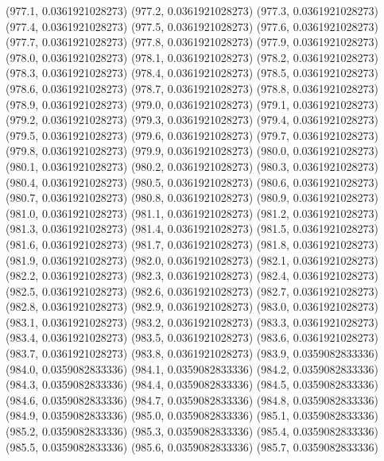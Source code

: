 {					(977.1, 0.0361921028273)
					(977.2, 0.0361921028273)
					(977.3, 0.0361921028273)
					(977.4, 0.0361921028273)
					(977.5, 0.0361921028273)
					(977.6, 0.0361921028273)
					(977.7, 0.0361921028273)
					(977.8, 0.0361921028273)
					(977.9, 0.0361921028273)
					(978.0, 0.0361921028273)
					(978.1, 0.0361921028273)
					(978.2, 0.0361921028273)
					(978.3, 0.0361921028273)
					(978.4, 0.0361921028273)
					(978.5, 0.0361921028273)
					(978.6, 0.0361921028273)
					(978.7, 0.0361921028273)
					(978.8, 0.0361921028273)
					(978.9, 0.0361921028273)
					(979.0, 0.0361921028273)
					(979.1, 0.0361921028273)
					(979.2, 0.0361921028273)
					(979.3, 0.0361921028273)
					(979.4, 0.0361921028273)
					(979.5, 0.0361921028273)
					(979.6, 0.0361921028273)
					(979.7, 0.0361921028273)
					(979.8, 0.0361921028273)
					(979.9, 0.0361921028273)
					(980.0, 0.0361921028273)
					(980.1, 0.0361921028273)
					(980.2, 0.0361921028273)
					(980.3, 0.0361921028273)
					(980.4, 0.0361921028273)
					(980.5, 0.0361921028273)
					(980.6, 0.0361921028273)
					(980.7, 0.0361921028273)
					(980.8, 0.0361921028273)
					(980.9, 0.0361921028273)
					(981.0, 0.0361921028273)
					(981.1, 0.0361921028273)
					(981.2, 0.0361921028273)
					(981.3, 0.0361921028273)
					(981.4, 0.0361921028273)
					(981.5, 0.0361921028273)
					(981.6, 0.0361921028273)
					(981.7, 0.0361921028273)
					(981.8, 0.0361921028273)
					(981.9, 0.0361921028273)
					(982.0, 0.0361921028273)
					(982.1, 0.0361921028273)
					(982.2, 0.0361921028273)
					(982.3, 0.0361921028273)
					(982.4, 0.0361921028273)
					(982.5, 0.0361921028273)
					(982.6, 0.0361921028273)
					(982.7, 0.0361921028273)
					(982.8, 0.0361921028273)
					(982.9, 0.0361921028273)
					(983.0, 0.0361921028273)
					(983.1, 0.0361921028273)
					(983.2, 0.0361921028273)
					(983.3, 0.0361921028273)
					(983.4, 0.0361921028273)
					(983.5, 0.0361921028273)
					(983.6, 0.0361921028273)
					(983.7, 0.0361921028273)
					(983.8, 0.0361921028273)
					(983.9, 0.0359082833336)
					(984.0, 0.0359082833336)
					(984.1, 0.0359082833336)
					(984.2, 0.0359082833336)
					(984.3, 0.0359082833336)
					(984.4, 0.0359082833336)
					(984.5, 0.0359082833336)
					(984.6, 0.0359082833336)
					(984.7, 0.0359082833336)
					(984.8, 0.0359082833336)
					(984.9, 0.0359082833336)
					(985.0, 0.0359082833336)
					(985.1, 0.0359082833336)
					(985.2, 0.0359082833336)
					(985.3, 0.0359082833336)
					(985.4, 0.0359082833336)
					(985.5, 0.0359082833336)
					(985.6, 0.0359082833336)
					(985.7, 0.0359082833336)
}
